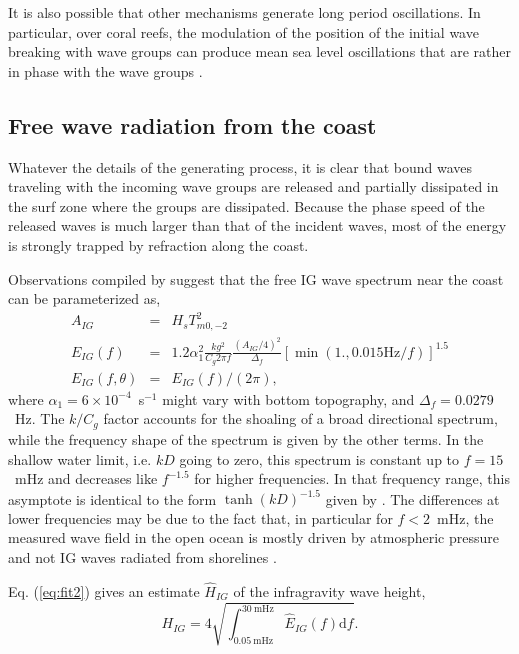 It is also possible that other mechanisms generate long period oscillations. In particular, over coral reefs, the modulation of the position of the initial wave breaking with wave groups 
can produce mean sea level oscillations that are rather in phase with the wave groups \citep{Symonds&al.1982}. 

\subsection{Free wave radiation from the coast}
Whatever the details of the generating process, it is clear that bound waves traveling with the incoming wave groups are released and partially dissipated in the 
surf zone where the groups are dissipated. Because the phase speed of the released waves is much larger than that of the incident waves, 
most of the energy is strongly trapped by refraction along the coast. 

Observations compiled by \cite{Ardhuin&al.2014} suggest that the free IG wave spectrum near the coast can be parameterized as, 
\begin{eqnarray}
 A_{IG} & =&    H_s T_{m0,-2}^2\label{eq:fit0} \\
{E}_{IG}(f)& = & 1.2 \alpha_1^2 \frac{k g^2}{C_g 2 \pi f} \frac{(A_{IG}/4)^2}{\Delta_f}   \left[\min( 1., 0.015\mathrm{Hz}/ f)\right]^{1.5} \label{eq:fit1} \\
{E}_{IG}(f,\theta) & = & {E}_{IG}(f) / (2 \pi ),
\label{eq:fit2} 
\end{eqnarray}
where $\alpha_1=6 \times 10^{-4}$~s$^{-1}$ might vary with bottom topography, and $\Delta_f = 0.0279$~Hz. 
The $k/C_g$ factor accounts for the shoaling of a broad directional spectrum, while the frequency shape of the spectrum
is given by the other terms. In the shallow water limit, i.e. $k D$ going to zero, this spectrum is constant up to $f=15$~mHz and 
decreases like $f^{-1.5}$ for higher frequencies. In that frequency range, this asymptote is identical to the form $\tanh(kD)^{-1.5}$ given by 
\cite{Godin&al.2013}. The differences at lower frequencies may be due to the fact that, in particular for $f < 2$~mHz, the measured wave 
field in the open ocean is mostly driven by atmospheric pressure and not IG waves radiated from shorelines \citep{Filloux1980,deJong&al.2003}.

Eq. (\ref{eq:fit2}) gives an estimate $\widehat{H}_{IG}$ of the infragravity wave height, 
\begin{equation}
H_{IG}   =  4 \sqrt{\int_{0.05~\mathrm{mHz}}^{30~\mathrm{mHz}} \widehat{E}_{IG}(f)\mathrm{d} f}.  \label{eq:fit3}  
\end{equation}



